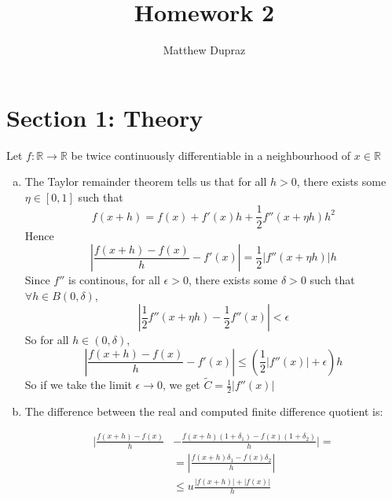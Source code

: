 \documentclass{article}
\title{Homework 2}
\author{Matthew Dupraz}
\newcommand{\R}{\mathbb{R}}
\begin{document}
\maketitle

\section*{Section 1: Theory}

Let $f: \R \to \R$ be twice continuously differentiable in a 
neighbourhood of $x\in \R$

\begin{enumerate}[(a)]
   \item
      The Taylor remainder theorem tells us that for all $h > 0$,
      there exists some $\eta \in [0, 1]$ such that
      \begin{equation*}
         f(x + h) = f(x) + f'(x)h + \frac{1}{2}f''(x + \eta h)h^2
      \end{equation*}
      Hence
      \begin{equation*}
         \left|\frac{f(x + h) - f(x)}{h} - f'(x)\right| =
         \frac{1}{2}|f''(x + \eta h)|h
      \end{equation*}
      Since $f''$ is continous, for all $\epsilon > 0$, there
      exists some $\delta > 0$ such that 
      $\forall h \in B(0, \delta)$,
      \begin{equation*}
         \left|\frac{1}{2}f''(x + \eta h) - \frac{1}{2}f''(x)\right| < \epsilon
      \end{equation*}
      So for all $h \in (0, \delta)$,
      \begin{equation*}
         \left|\frac{f(x+h) - f(x)}{h} - f'(x)\right| \leq 
         \left(\frac{1}{2}|f''(x)| + \epsilon\right)h
      \end{equation*}
      So if we take the limit $\epsilon \to 0$, we get
      $\tilde{C} = \frac{1}{2}|f''(x)|$
   \item
      The difference between the real and computed finite difference quotient
      is:
      
      \begin{align*}
         \Bigg|\frac{f(x+h) - f(x)}{h} &-
         \frac{f(x+h)(1 + \delta_1) - f(x)(1 + \delta_2)}{h}\Bigg| = \\
         &= \left|\frac{f(x+h)\delta_1 - f(x)\delta_2}{h}\right|\\
         &\leq u\frac{|f(x+h)|+|f(x)|}{h}
      \end{align*}


\end{enumerate}
\end{document}
